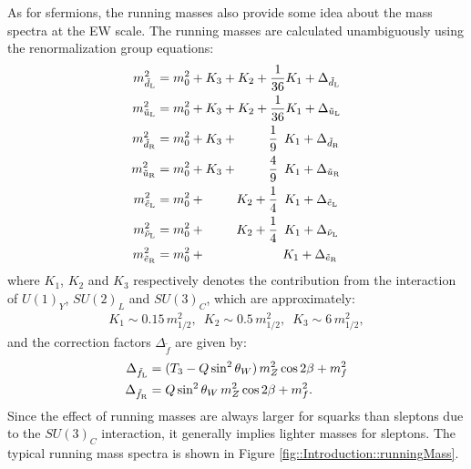 As for sfermions, the running masses also provide some idea about the mass spectra at the EW scale.
The running masses are calculated unambiguously using the renormalization group equations:
\begin{align}
m_{\tilde{d}_{\mathrm{L}}}^2   & = m_0^2 + K_3                    + K_2                    + \frac{1}{36} K_1 + \Delta_{\tilde{d}_{\mathrm{L}}}   \nonumber  \\ 
m_{\tilde{u}_{\mathrm{L}}}^2   & = m_0^2 + K_3                    + K_2                    + \frac{1}{36} K_1 + \Delta_{\tilde{u}_{\mathrm{L}}}   \nonumber  \\ 
m_{\tilde{d}_{\mathrm{R}}}^2   & = m_0^2 + K_3                    + \mbox{\phantom{$K_2$ +}} \frac{1}{9} \,\,\,  K_1 +  \Delta_{\tilde{d}_{\mathrm{R}}}   \nonumber  \\ 
m_{\tilde{u}_{\mathrm{R}}}^2   & = m_0^2 + K_3                    + \mbox{\phantom{$K_2$ +}} \frac{4}{9} \,\,\,  K_1 +  \Delta_{\tilde{u}_{\mathrm{R}}}   \nonumber  \\ 
m_{\tilde{e}_{\mathrm{L}}}^2   & = m_0^2 + \mbox{\phantom{$K_3$ +}} K_2                    + \frac{1}{4} \,\,\,  K_1 +  \Delta_{\tilde{e}_{\mathrm{L}}}   \nonumber  \\ 
m_{\tilde{\nu}_{\mathrm{L}}}^2 & = m_0^2 + \mbox{\phantom{$K_3$ +}} K_2                    + \frac{1}{4} \,\,\,  K_1 +  \Delta_{\tilde{\nu}_{\mathrm{L}}} \nonumber  \\ 
m_{\tilde{e}_{\mathrm{R}}}^2   & = m_0^2 + \mbox{\phantom{$K_3$ +}} \mbox{\phantom{$K_2$ +}} \mbox{\phantom{kk}}\, K_1 + \Delta_{\tilde{e}_{\mathrm{R}}}   \nonumber  
\end{align}
where $K_1$, $K_2$ and $K_3$ respectively denotes the contribution from the interaction of $U(1)_Y$, $SU(2)_L$ and $SU(3)_C$, which are approximately:
\begin{align}
K_1 \sim 0.15 \, m_{1/2}^2, \,\,\, K_2 \sim 0.5 \, m_{1/2}^2, \,\,\, K_3 \sim 6 \, m_{1/2}^2,
\end{align}
and the correction factors $\Delta_{\tilde{f}}$ are given by:
\begin{align}
\Delta_{\tilde{f}_\mathrm{L}} & = (T_3-Q\sin^2{\theta_W}) \, m_Z^2 \cos{2\beta} + m_f^2   \nonumber \\
\Delta_{\tilde{f}_\mathrm{R}} & = Q\sin^2{\theta_W} \, m_Z^2 \cos{2\beta} + m_f^2.   \nonumber 
\end{align}
Since the effect of running masses are always larger for squarks than sleptons due to the $SU(3)_C$ interaction, 
it generally implies lighter masses for sleptons.
The typical running mass spectra is shown in Figure \ref{fig::Introduction::runningMass}. \\

